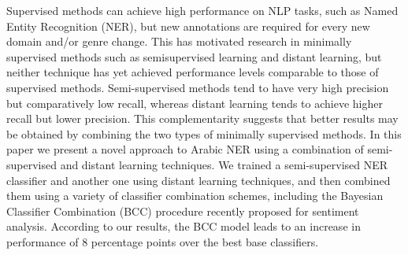 Supervised methods can achieve high performance on NLP tasks, such as Named Entity Recognition (NER), but new annotations are required for every new domain and/or genre change. This has motivated research in minimally supervised methods such as semisupervised learning and distant learning, but neither technique has yet achieved performance levels comparable to those of supervised methods. Semi-supervised methods tend to have very high precision but comparatively low recall, whereas distant learning tends to achieve higher recall but lower precision. This complementarity suggests that better results may be obtained by combining the two types of minimally supervised methods. In this paper we present a novel approach to Arabic NER using a combination of semi-supervised and distant learning techniques. We trained a semi-supervised NER classifier and another one using distant learning techniques, and then combined them using a variety of classifier combination schemes, including the Bayesian Classifier Combination (BCC) procedure recently proposed for sentiment analysis. According to our results, the BCC model leads to an increase in performance of 8 percentage points over the best base classifiers.
